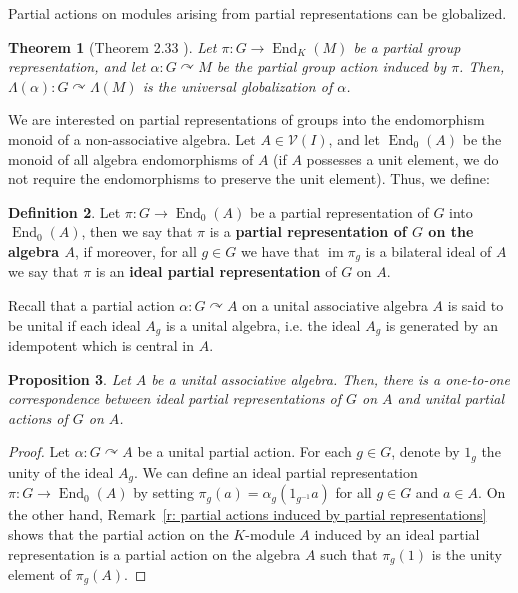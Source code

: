\documentclass[11pt]{amsart}
\numberwithin{equation}{section}
\newtheorem{theorem}{Theorem}[section] %
\newtheorem{proposition}[theorem]{Proposition}
\theoremstyle{definition}
\newtheorem{definition}[theorem]{Definition}
\theoremstyle{remark}
\newcommand*{\im}{\operatorname{im}} %
\begin{document}
Partial actions on modules arising from partial representations can be globalized. 



\begin{theorem}[Theorem 2.33 \cite{Article_Jerez_2024_OTHOPGA}]\label{t: globalization of partial representations}
    Let $\pi: G \to \operatorname{End}_{K}(M)$ be a partial group representation, and let $\alpha: G \curvearrowright M$ be the partial group action induced by $\pi$. Then, $\Lambda(\alpha): G \curvearrowright \Lambda(M)$  is the universal globalization of $\alpha$.
\end{theorem}



We are interested on partial representations of groups into the endomorphism monoid of a non-associative algebra.
Let  \(A \in \mathcal{V}(I)\), and let \(\operatorname{End}_0(A)\) be the monoid of all algebra endomorphisms of \(A\) (if \(A\) possesses a unit element, we do not require the endomorphisms to preserve the unit element). Thus, we define:
\begin{definition}
    Let \(\pi: G \to \operatorname{End}_0(A)\) be a partial representation of \(G\) into \(\operatorname{End}_0(A)\), then we say that \(\pi\) is a \textbf{ partial representation of \(G\) on the algebra \(A\)}, if moreover, for all \(g \in G\) we have that \(\im \pi_g\) is a bilateral ideal of \(A\) we say that \(\pi\) is an {\bf ideal partial representation} of \(G\) on \(A\).
\end{definition}

Recall that a partial action $\alpha: G\curvearrowright A$ on a unital associative algebra $A$ is said to be unital if each ideal $A_g$ is  a unital algebra, i.e. the ideal $A_g$ is generated by an idempotent which is central in $A.$

\begin{proposition}\label{prop:one-to-one}
    Let \(A\) be a unital associative algebra.
    Then, there is a one-to-one correspondence between ideal partial representations  of \(G\) on \(A\) and unital partial actions of \(G\) on \(A\).
\end{proposition}
\begin{proof}
    Let \(\alpha: G \curvearrowright A\) be a unital partial action. For each $g\in G$, denote by $1_g$ the unity of the ideal  $A_g$. We can define an  ideal partial representation \(\pi: G \to \operatorname{End}_0(A)\) by setting \(\pi_g(a) = \alpha_g(1_{g^{-1}} a)\) for all \(g \in G\) and \(a \in A\).
    On the other  hand,  Remark~\ref{r: partial actions induced by partial representations} shows that the partial action on the $K$-module $A$ induced by an  ideal  partial  representation is a   partial action on the algebra $A$ such that $\pi _g (1)$ is the unity element of $\pi _g (A).$
\end{proof}
\end{document}
